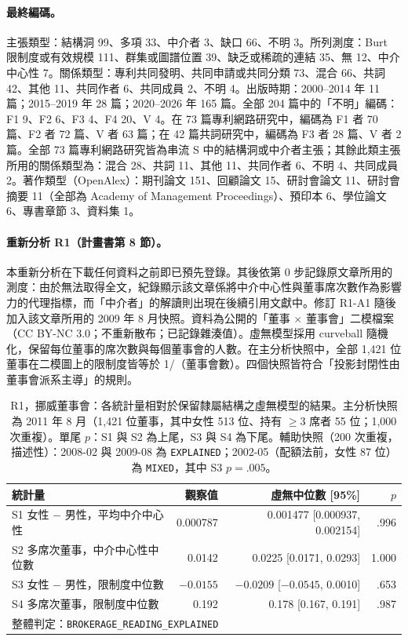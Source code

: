 \paragraph{最終編碼。} 主張類型：結構洞 99、多項 33、中介者 3、缺口 66、不明 3。所列測度：Burt 限制度或有效規模 111、群集或圖譜位置 39、缺乏或稀疏的連結 35、無 12、中介中心性 7。關係類型：專利共同發明、共同申請或共同分類 73、混合 66、共詞 42、其他 11、共同作者 6、共同成員 2、不明 4。出版時期：2000--2014 年 11 篇；2015--2019 年 28 篇；2020--2026 年 165 篇。全部 204 篇中的「不明」編碼：F1 9、F2 6、F3 4、F4 20、V 4。在 73 篇專利網路研究中，編碼為 F1 者 70 篇、F2 者 72 篇、V 者 63 篇；在 42 篇共詞研究中，編碼為 F3 者 28 篇、V 者 2 篇。全部 73 篇專利網路研究皆為串流 S 中的結構洞或中介者主張；其餘此類主張所用的關係類型為：混合 28、共詞 11、其他 11、共同作者 6、不明 4、共同成員 2。著作類型（OpenAlex）：期刊論文 151、回顧論文 15、研討會論文 11、研討會摘要 11（全部為 Academy of Management Proceedings）、預印本 6、學位論文 6、專書章節 3、資料集 1。

\paragraph{重新分析 R1（計畫書第 8 節）。} 本重新分析在下載任何資料之前即已預先登錄。其後依第 0 步記錄原文章所用的測度：由於無法取得全文，紀錄顯示該文章係將中介中心性與董事席次數作為影響力的代理指標，而「中介者」的解讀則出現在後續引用文獻中。修訂 R1-A1 隨後加入該文章所用的 2009 年 8 月快照。資料為公開的「董事 $\times$ 董事會」二模檔案（CC BY-NC 3.0；不重新散布；已記錄雜湊值）。虛無模型採用 curveball 隨機化，保留每位董事的席次數與每個董事會的人數。在主分析快照中，全部 1,421 位董事在二模圖上的限制度皆等於 1/（董事會數）。四個快照皆符合「投影封閉性由董事會派系主導」的規則。

\begin{table}[htbp]
  \centering
  \caption{R1，挪威董事會：各統計量相對於保留隸屬結構之虛無模型的結果。主分析快照為 2011 年 8 月（1,421 位董事，其中女性 513 位、持有 $\geq 3$ 席者 55 位；1,000 次重複）。單尾 $p$：S1 與 S2 為上尾，S3 與 S4 為下尾。輔助快照（200 次重複，描述性）：2008-02 與 2009-08 為 \texttt{EXPLAINED}；2002-05（配額法前，女性 87 位）為 \texttt{MIXED}，其中 S3 $p=.005$。}
  \label{zh:tab:app_r1}
  \small
  \begin{tabular}{lrrr}
    \toprule
    統計量 & 觀察值 & 虛無中位數 [95\%] & $p$ \\
    \midrule
    S1 女性 $-$ 男性，平均中介中心性 & 0.000787 & 0.001477 [0.000937, 0.002154] & .996 \\
    S2 多席次董事，中介中心性中位數 & 0.0142 & 0.0225 [0.0171, 0.0293] & 1.000 \\
    S3 女性 $-$ 男性，限制度中位數 & $-0.0155$ & $-0.0209$ [$-0.0545$, 0.0010] & .653 \\
    S4 多席次董事，限制度中位數 & 0.192 & 0.178 [0.167, 0.191] & .987 \\
    \midrule
    \multicolumn{4}{l}{整體判定：\texttt{BROKERAGE\_\allowbreak READING\_\allowbreak EXPLAINED}} \\
    \bottomrule
  \end{tabular}
\end{table}
